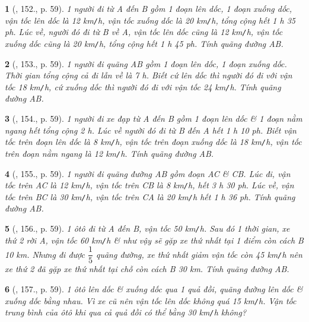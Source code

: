 \documentclass{article}
\newtheorem{baitoan}{}
\begin{document}
\begin{baitoan}[\cite{Binh_Toan_6_tap_2}, 152., p. 59]
	1 người đi từ A đến B gồm 1 đoạn lên dốc, 1 đoạn xuống dốc, vận tốc lên dốc là {\rm12 km{\tt/}h}, vận tốc xuống dốc là {\rm20 km{\tt/}h}, tổng cộng hết {\rm1 h 35 ph}. Lúc về, người đó đi từ B về A, vận tốc lên dốc cũng là {\rm12 km{\tt/}h}, vận tốc xuống dốc cũng là {\rm20 km{\tt/}h}, tổng cộng hết {\rm1 h 45 ph}. Tính quãng đường AB.
\end{baitoan}

\begin{baitoan}[\cite{Binh_Toan_6_tap_2}, 153., p. 59]
	1 người đi quãng AB gồm 1 đoạn lên dốc, 1 đoạn xuống dốc. Thời gian tổng cộng cả đi lẫn về là {\rm7 h}. Biết cứ lên dốc thì người đó đi với vận tốc {\rm18 km{\tt/}h}, cứ xuống dốc thì người đó đi với vận tốc {\rm24 km{\tt/}h}. Tính quãng đường AB.
\end{baitoan}

\begin{baitoan}[\cite{Binh_Toan_6_tap_2}, 154., p. 59]
	1 người đi xe đạp từ A đến B gồm 1 đoạn lên dốc \& 1 đoạn nằm ngang hết tổng cộng {\rm2 h}. Lúc về người đó đi từ B đến A hết {\rm1 h 10 ph}. Biết vận tốc trên đoạn lên dốc là {\rm8 km{\tt/}h}, vận tốc trên đoạn xuống dốc là {\rm18 km{\tt/}h}, vận tốc trên đoạn nằm ngang là {\rm12 km{\tt/}h}. Tính quãng đường AB.
\end{baitoan}

\begin{baitoan}[\cite{Binh_Toan_6_tap_2}, 155., p. 59]
	1 người đi quãng đường AB gồm đoạn AC \& CB. Lúc đi, vận tốc trên AC là {\rm12 km{\tt/}h}, vận tốc trên CB là {\rm8 km{\tt/}h}, hết {\rm3 h 30 ph}. Lúc về, vận tốc trên BC là {\rm30 km{\tt/}h}, vận tốc trên CA là {\rm20 km{\tt/}h} hết {\rm1 h 36 ph}. Tính quãng đường AB.
\end{baitoan}

\begin{baitoan}[\cite{Binh_Toan_6_tap_2}, 156., p. 59]
	1 ôtô đi từ A đến B, vận tốc {\rm50 km{\tt/}h}. Sau đó 1 thời gian, xe thứ 2 rời A, vận tốc {\rm60 km{\tt/}h} \& như vậy sẽ gặp xe thứ nhất tại 1 điểm còn cách B {\rm10 km}. Nhưng đi được $\dfrac{1}{5}$ quãng đường, xe thứ nhất giảm vận tốc còn {\rm45 km{\tt/}h} nên xe thứ 2 đã gặp xe thứ nhất tại chỗ còn cách B {\rm30 km}. Tính quãng đường AB.
\end{baitoan}

\begin{baitoan}[\cite{Binh_Toan_6_tap_2}, 157., p. 59]
	1 ôtô lên dốc \& xuống dốc qua 1 quả đồi, quãng đường lên dốc \& xuống dốc bằng nhau. Vì xe cũ nên vận tốc lên dốc không quá {\rm15 km{\tt/}h}. Vận tốc trung bình của ôtô khi qua cả quả đồi có thể bằng {\rm30 km{\tt/}h} không?
\end{baitoan}
\end{document}
